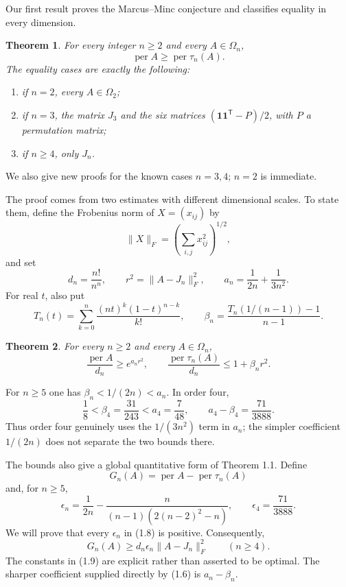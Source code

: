 \documentclass[11pt]{article}
\newtheorem{theorem}{Theorem}[section]
\begin{document}
Our first result proves the Marcus--Minc conjecture and classifies equality in
every dimension.

\begin{theorem}
For every integer $n\ge2$ and every $A\in\Omega_n$,
\[
\operatorname{per}A\ge\operatorname{per}\tau_n(A).
\tag{1.3}
\]
The equality cases are exactly the following:

\begin{enumerate}
\item if $n=2$, every $A\in\Omega_2$;
\item if $n=3$, the matrix $J_3$ and the six matrices
$(\mathbf1\mathbf1^{\mathsf T}-P)/2$, with $P$ a permutation matrix;
\item if $n\ge4$, only $J_n$.
\end{enumerate}
\end{theorem}

We also give new proofs for the known cases $n=3,4$; $n=2$ is immediate.

The proof comes from two estimates with different dimensional scales. To state
them, define the Frobenius norm of $X=(x_{ij})$ by
\[
\|X\|_F=\left(\sum_{i,j}x_{ij}^2\right)^{1/2},
\]
and set
\[
d_n=\frac{n!}{n^n},\qquad
r^2=\|A-J_n\|_F^2,\qquad
a_n=\frac1{2n}+\frac1{3n^2}.
\tag{1.4}
\]
For real $t$, also put
\[
T_n(t)=\sum_{k=0}^n\frac{(nt)^k(1-t)^{n-k}}{k!},
\qquad
\beta_n=\frac{T_n(1/(n-1))-1}{n-1}.
\tag{1.5}
\]
\begin{theorem}
For every $n\ge2$ and every $A\in\Omega_n$,
\[
\frac{\operatorname{per}A}{d_n}\ge e^{a_nr^2},
\qquad
\frac{\operatorname{per}\tau_n(A)}{d_n}\le1+\beta_nr^2.
\tag{1.6}
\]
\end{theorem}

For $n\ge5$ one has $\beta_n<1/(2n)<a_n$. In order four,
\[
\frac18<\beta_4=\frac{31}{243}<a_4=\frac7{48},
\qquad
a_4-\beta_4=\frac{71}{3888}.
\tag{1.7}
\]
Thus order four genuinely uses the $1/(3n^2)$ term in $a_n$; the simpler
coefficient $1/(2n)$ does not separate the two bounds there.

The bounds also give a global quantitative form of Theorem 1.1. Define
\[
G_n(A)=\operatorname{per}A-\operatorname{per}\tau_n(A)
\]
and, for $n\ge5$,
\[
\epsilon_n=\frac1{2n}-
\frac{n}{(n-1)(2(n-2)^2-n)},
\qquad
\epsilon_4=\frac{71}{3888}.
\tag{1.8}
\]
We will prove that every $\epsilon_n$ in (1.8) is positive. Consequently,
\[
G_n(A)\ge d_n\epsilon_n\|A-J_n\|_F^2
\qquad(n\ge4).
\tag{1.9}
\]
The constants in (1.9) are explicit rather than asserted to be optimal. The
sharper coefficient supplied directly by (1.6) is $a_n-\beta_n$.
\end{document}
